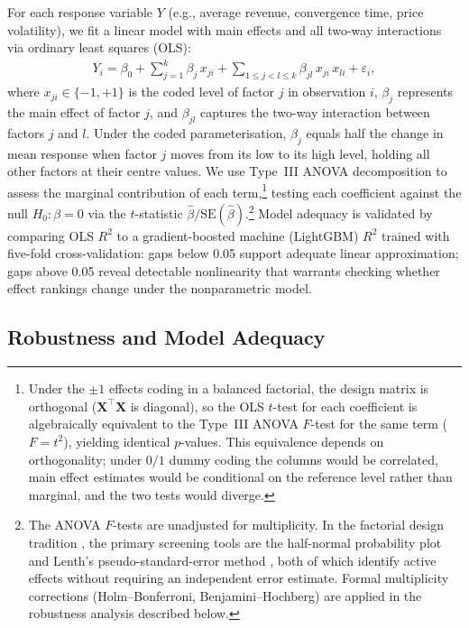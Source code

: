 For each response variable $Y$ (e.g., average revenue, convergence time, price volatility), we fit a linear model with main effects and all two-way interactions via ordinary least squares (OLS):
\begin{align}
  Y_i = \beta_0 + \sum_{j=1}^{k} \beta_j\, x_{ji} + \sum_{1 \le j < l \le k} \beta_{jl}\, x_{ji}\, x_{li} + \varepsilon_i,
  \label{eq:ols}
\end{align}
where $x_{ji} \in \{-1, +1\}$ is the coded level of factor $j$ in observation $i$, $\beta_j$ represents the main effect of factor $j$, and $\beta_{jl}$ captures the two-way interaction between factors $j$ and $l$. Under the coded parameterisation, $\beta_j$ equals half the change in mean response when factor $j$ moves from its low to its high level, holding all other factors at their centre values. We use Type~III ANOVA decomposition to assess the marginal contribution of each term,\footnote{Under the $\pm 1$ effects coding in a balanced factorial, the design matrix is orthogonal ($\mathbf{X}^\top\mathbf{X}$ is diagonal), so the OLS $t$-test for each coefficient is algebraically equivalent to the Type~III ANOVA $F$-test for the same term ($F = t^2$), yielding identical $p$-values. This equivalence depends on orthogonality; under $0/1$ dummy coding the columns would be correlated, main effect estimates would be conditional on the reference level rather than marginal, and the two tests would diverge.} testing each coefficient against the null $H_0\!: \beta = 0$ via the $t$-statistic $\hat{\beta}/\text{SE}(\hat{\beta})$.\footnote{The ANOVA $F$-tests are unadjusted for multiplicity. In the factorial design tradition \citep{Box2005}, the primary screening tools are the half-normal probability plot and Lenth's pseudo-standard-error method \citep{Lenth1989}, both of which identify active effects without requiring an independent error estimate. Formal multiplicity corrections (Holm--Bonferroni, Benjamini--Hochberg) are applied in the robustness analysis described below.} Model adequacy is validated by comparing OLS $R^2$ to a gradient-boosted machine (LightGBM) $R^2$ trained with five-fold cross-validation: gaps below 0.05 support adequate linear approximation; gaps above 0.05 reveal detectable nonlinearity that warrants checking whether effect rankings change under the nonparametric model.

\subsection{Robustness and Model Adequacy}

